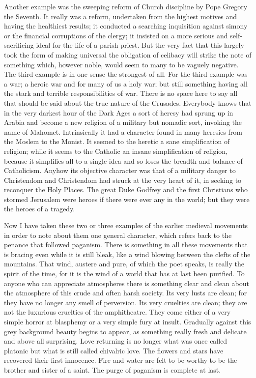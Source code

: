\documentclass{book}
\begin{document}
Another example was the sweeping reform of Church discipline by Pope Gregory the Seventh. It really was a reform, undertaken from the highest motives and having the healthiest results; it conducted a searching inquisition against simony or the financial corruptions of the clergy; it insisted on a more serious and self-sacrificing ideal for the life of a parish priest. But the very fact that this largely took the form of making universal the obligation of celibacy will strike the note of something which, however noble, would seem to many to be vaguely negative. The third example is in one sense the strongest of all. For the third example was a war; a heroic war and for many of us a holy war; but still something having all the stark and terrible responsibilities of war. There is no space here to say all that should be said about the true nature of the Crusades. Everybody knows that in the very darkest hour of the Dark Ages a sort of heresy had sprung up in Arabia and become a new religion of a military but nomadic sort, invoking the name of Mahomet. Intrinsically it had a character found in many heresies from the Moslem to the Monist. It seemed to the heretic a sane simplification of religion; while it seems to the Catholic an insane simplification of religion, because it simplifies all to a single idea and so loses the breadth and balance of Catholicism. Anyhow its objective character was that of a military danger to Christendom and Christendom had struck at the very heart of it, in seeking to reconquer the Holy Places. The great Duke Godfrey and the first Christians who stormed Jerusalem were heroes if there were ever any in the world; but they were the heroes of a tragedy.

Now I have taken these two or three examples of the earlier medieval movements in order to note about them one general character, which refers back to the penance that followed paganism. There is something in all these movements that is bracing even while it is still bleak, like a wind blowing between the clefts of the mountains. That wind, austere and pure, of which the poet speaks, is really the spirit of the time, for it is the wind of a world that has at last been purified. To anyone who can appreciate atmospheres there is something clear and clean about the atmosphere of this crude and often harsh society. Its very lusts are clean; for they have no longer any smell of perversion. Its very cruelties are clean; they are not the luxurious cruelties of the amphitheatre. They come either of a very simple horror at blasphemy or a very simple fury at insult. Gradually against this grey background beauty begins to appear, as something really fresh and delicate and above all surprising. Love returning is no longer what was once called platonic but what is still called chivalric love. The flowers and stars have recovered their first innocence. Fire and water are felt to be worthy to be the brother and sister of a saint. The purge of paganism is complete at last.
\end{document}
